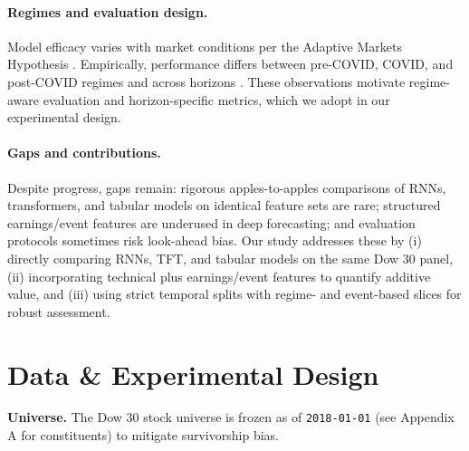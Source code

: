 \documentclass[10pt,twocolumn]{article}
\begin{document}
\paragraph{Regimes and evaluation design.} Model efficacy varies with market conditions per the Adaptive Markets Hypothesis \citep{lo2004}. Empirically, performance differs between pre-COVID, COVID, and post-COVID regimes and across horizons \citep{zhang2023review}. These observations motivate regime-aware evaluation and horizon-specific metrics, which we adopt in our experimental design.

\paragraph{Gaps and contributions.} Despite progress, gaps remain: rigorous apples-to-apples comparisons of RNNs, transformers, and tabular models on identical feature sets are rare; structured earnings/event features are underused in deep forecasting; and evaluation protocols sometimes risk look-ahead bias. Our study addresses these by (i) directly comparing RNNs, TFT, and tabular models on the same Dow 30 panel, (ii) incorporating technical plus earnings/event features to quantify additive value, and (iii) using strict temporal splits with regime- and event-based slices for robust assessment.



\section{Data \& Experimental Design}
\textbf{Universe.} The Dow 30 stock universe is frozen as of \texttt{2018-01-01} (see Appendix A for constituents) to mitigate survivorship bias.
\end{document}
